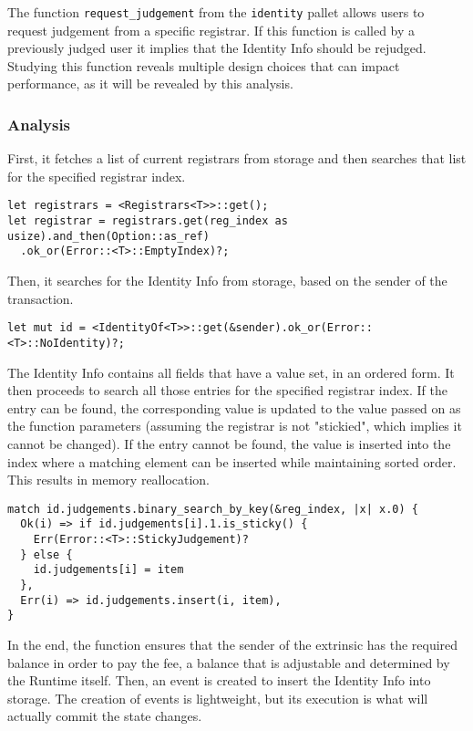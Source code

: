 \documentclass[11pt,a4paper]{article}
\begin{document}
The function \verb|request_judgement| from the \verb|identity| pallet allows
users to request judgement from a specific registrar. If this function is called
by a previously judged user it implies that the Identity Info should be
rejudged. Studying this function reveals multiple design choices that can impact
performance, as it will be revealed by this analysis.
\newline

\subsubsection{Analysis}

First, it fetches a list of current registrars from storage and then searches
that list for the specified registrar index.

\begin{verbatim}
let registrars = <Registrars<T>>::get();
let registrar = registrars.get(reg_index as usize).and_then(Option::as_ref)
  .ok_or(Error::<T>::EmptyIndex)?;
\end{verbatim}

Then, it searches for the Identity Info from storage, based on the sender of the
transaction.

\begin{verbatim}
let mut id = <IdentityOf<T>>::get(&sender).ok_or(Error::<T>::NoIdentity)?;
\end{verbatim}

The Identity Info contains all fields that have a value set, in an ordered form.
It then proceeds to search all those entries for the specified registrar index.
If the entry can be found, the corresponding value is updated to the value
passed on as the function parameters (assuming the registrar is not "stickied",
which implies it cannot be changed). If the entry cannot be found, the value is
inserted into the index where a matching element can be inserted while
maintaining sorted order. This results in memory reallocation.

\begin{verbatim}
match id.judgements.binary_search_by_key(&reg_index, |x| x.0) {
  Ok(i) => if id.judgements[i].1.is_sticky() {
    Err(Error::<T>::StickyJudgement)?
  } else {
    id.judgements[i] = item
  },
  Err(i) => id.judgements.insert(i, item),
}
\end{verbatim}

In the end, the function ensures that the sender of the extrinsic has the
required balance in order to pay the fee, a balance that is adjustable and
determined by the Runtime itself. Then, an event is created to insert the
Identity Info into storage. The creation of events is lightweight, but its
execution is what will actually commit the state changes.
\end{document}
